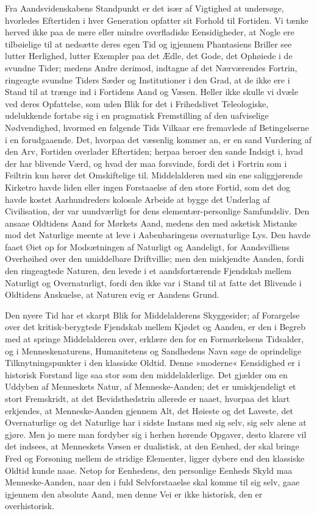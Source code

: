 \documentclass[12pt]{book}
\newcommand{\apage}[1]{\marginnote{\footnotesize\textit{[#1]}}}
\begin{document}
Fra Aandsvidenskabens Standpunkt er det især af Vigtighed at undersøge,
hvorledes Eftertiden i hver Generation opfatter sit Forhold til Fortiden. Vi
tænke herved ikke paa de mere eller mindre overfladiske Eensidigheder, at
Nogle ere tilbøielige til at nedsætte deres egen Tid og igjennem Phantasiens
Briller see lutter Herlighed, lutter Exempler paa det Ædle, det Gode, det
Ophøiede i de svundne Tider; medens Andre derimod, indtagne af det
Nærværendes Fortrin, ringeagte svundne Tiders Sæder og Institutioner i den
Grad, at de ikke ere i Stand til at trænge ind i Fortidens Aand og Væsen.
Heller ikke skulle vi dvæle ved deres Opfattelse, som uden Blik for det i
Frihedslivet Teleologiske, udelukkende fortabe sig i en pragmatisk
Fremstilling af den uafviselige Nødvendighed, hvormed en følgende Tids
Vilkaar ere fremavlede af Betingelserne i en forudgaaende. Det, hvorpaa det
væsenlig kommer an, er en sand Vurdering af den Arv, Fortiden  \apage{242} overlader
Eftertiden; herpaa beroer den sande Indsigt i, hvad der har blivende Værd,
og hvad der maa forsvinde, fordi det i Fortrin som i Feiltrin kun hører det
Omskiftelige til. Middelalderen med sin ene saliggjørende Kirketro havde
liden eller ingen Forstaaelse af den store Fortid, som det dog havde kostet
Aarhundreders kolosale Arbeide at bygge det Underlag af Civilisation, der var
uundværligt for dens elementær-personlige Samfundsliv. Den ansaae Oldtidens
Aand for Mørkets Aand, medens den med asketisk Mistanke mod det Naturlige
meente at leve i Aabenbaringens overnaturlige Lys. Den havde faaet Øiet op
for Modsætningen af Naturligt og Aandeligt, for Aandsvilliens Overhøihed
over den umiddelbare Driftvillie; men den miskjendte Aanden, fordi den
ringeagtede Naturen, den levede i et aandsfortærende Fjendskab mellem
Naturligt og Overnaturligt, fordi den ikke var i Stand til at fatte det
Blivende i Oldtidens Anskuelse, at Naturen evig er Aandens Grund.

Den nyere Tid har et skarpt Blik for Middelalderens Skyggesider; af
Forargelse over det kritisk-berygtede Fjendskab mellem Kjødet og Aanden, er
den i Begreb med at springe Middelalderen over, erklære den for en
Formørkelsens Tidsalder, og i Menneskenaturens, Humanitetens og Sandhedens
Navn søge de oprindelige Tilknytningspunkter i den klassiske Oldtid. Denne
»moderne« Eensidighed er i historisk Forstand lige saa stor som den
middelalderlige. Det gjælder om en Uddyben af Menneskets Natur, af
Menneske-Aanden; det er umiskjendeligt et stort Fremskridt, at \apage{243} det
Bevidsthedstrin allerede er naaet, hvorpaa det klart erkjendes, at
Menneske-Aanden gjennem Alt, det Høieste og det Laveste, det Overnaturlige
og det Naturlige har i sidste Instans med sig selv, sig selv alene at gjøre.
Men jo mere man fordyber sig i herhen hørende Opgaver, desto klarere vil det
indsees, at Menneskets Væsen er dualistisk, at den Eenhed, der skal bringe
Fred og Forsoning mellem de stridige Elementer, ligger dybere end den
klassiske Oldtid kunde naae. Netop for Eenhedens, den personlige Eenheds
Skyld maa Menneske-Aanden, naar den i fuld Selvforstaaelse skal komme til
sig selv, gaae igjennem den absolute Aand, men denne Vei er ikke historisk,
den er overhistorisk.
\end{document}
